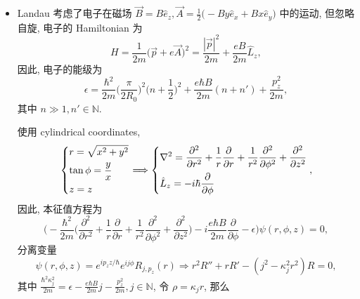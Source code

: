 \begin{itemize}
	\item Landau 考虑了电子在磁场 $\vec{B} = B \hat{e}_z, \vec{A} = \frac{1}{2} \big( - B y \hat{e}_x + B x \hat{e}_y \big)$ 中的运动, 但忽略自旋, 电子的 Hamiltonian 为
	\begin{equation}
		H = \frac{1}{2 m} \Big( \vec{p} + e \vec{A} \Big)^2 = \frac{|\vec{p}|^2}{2 m} + \frac{e B}{2 m} \hat{L}_z,
	\end{equation}
	因此, 电子的能级为
	\begin{equation}
		\epsilon = \frac{\hbar^2}{2 m} \Big( \frac{\pi}{2 R_0} \Big)^2 \Big( n + \frac{1}{2} \Big)^2 + \frac{e \hbar B}{2 m} (n + n') + \frac{p_z^2}{2 m},
	\end{equation}
	其中 $n \gg 1, n' \in \mathbb{N}$.
	
	\begin{tcolorbox}[title=calculation:]
		使用 cylindrical coordinates,
		\begin{equation}
			\begin{dcases}
				r = \sqrt{x^2 + y^2} \\
				\tan \phi = \frac{y}{x} \\
				z = z
			\end{dcases} \Longrightarrow \begin{dcases}
				\nabla^2 = \frac{\partial^2}{\partial r^2} + \frac{1}{r} \frac{\partial}{\partial r} + \frac{1}{r^2} \frac{\partial^2}{\partial \phi^2} + \frac{\partial^2}{\partial z^2} \\
				\hat{L}_z = - i \hbar \frac{\partial}{\partial \phi}
			\end{dcases},
		\end{equation}
		因此, 本征值方程为
		\begin{equation}
			\Big( - \frac{\hbar^2}{2 m} \Big( \frac{\partial^2}{\partial r^2} + \frac{1}{r} \frac{\partial}{\partial r} + \frac{1}{r^2} \frac{\partial^2}{\partial \phi^2} + \frac{\partial^2}{\partial z^2} \Big) - i \frac{e \hbar B}{2 m} \frac{\partial}{\partial \phi} - \epsilon \Big) \psi(r, \phi, z) = 0,
		\end{equation}
		分离变量
		\begin{equation}
			\psi(r, \phi, z) = e^{i p_z z / \hbar} e^{i j \phi} R_{j, p_z}(r) \Longrightarrow r^2 R'' + r R' - (j^2 - \kappa_j^2 r^2) R = 0,
		\end{equation}
		其中 $\frac{\hbar^2 \kappa_j^2}{2 m} = \epsilon - \frac{e \hbar B}{2 m} j - \frac{p_z^2}{2 m}, j \in \mathbb{N}$, 令 $\rho = \kappa_j r$, 那么
		\begin{equation}

\end{equation}
\end{tcolorbox}
\end{itemize}
